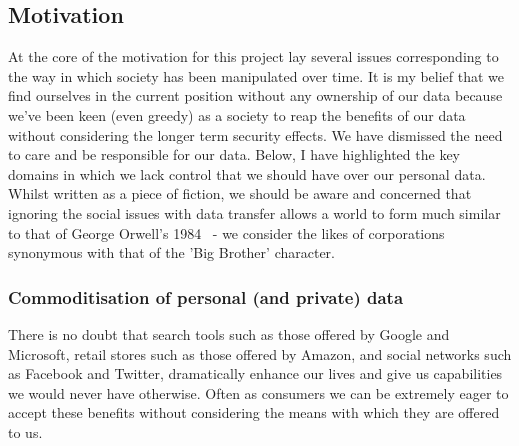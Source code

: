 \subsection{Motivation}

At the core of the motivation for this project lay several issues corresponding to the way in which society has been manipulated over time. It is my belief that we find ourselves in the current position without any ownership of our data because we've been keen (even greedy) as a society to reap the benefits of our data without considering the longer term security effects. We have dismissed the need to care and be responsible for our data. Below, I have highlighted the key domains in which we lack control that we should have over our personal data. Whilst written as a piece of fiction, we should be aware and concerned that ignoring the social issues with data transfer allows a world to form much similar to that of George Orwell's 1984~\autocite{orwell:1984:book} - we consider the likes of corporations synonymous with that of the 'Big Brother' character.

\subsubsection{Commoditisation of personal (and private) data}

There is no doubt that search tools such as those offered by Google and Microsoft, retail stores such as those offered by Amazon, and social networks such as Facebook and Twitter, dramatically enhance our lives and give us capabilities we would never have otherwise. Often as consumers we can be extremely eager to accept these benefits without considering the means with which they are offered to us.

